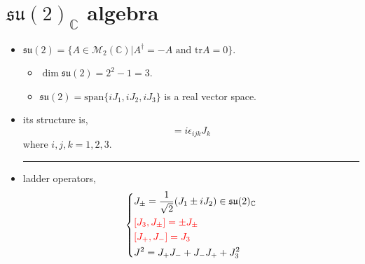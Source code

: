 \chapter{\texorpdfstring{$\mathfrak{su}(2)_\mathbb{C}$}{su(2)\_C} algebra}
\begin{itemize}
	\item $\mathfrak{su}(2) = \{A \in \mathcal{M}_2(\mathbb{C}) | A^\dag = - A \text{ and } \mathrm{tr} A = 0\}$.
	\begin{itemize}
		\item $\dim \mathfrak{su}(2) = 2^2 - 1 = 3$.
		
		\item $\mathfrak{su}(2) = \mathrm{span} \{i J_1, i J_2, i J_3\}$ is a real vector space.
	\end{itemize}
	
	\item its structure is,
	\begin{equation}
		[J_i, J_j] = i \epsilon_{i j k} J_k
	\end{equation}
	where $i, j, k = 1, 2, 3$.
	
	\noindent\rule[0.5ex]{\linewidth}{0.5pt} %
	
	\item ladder operators,
	\begin{equation}
		\begin{dcases}
			J_\pm = \frac{1}{\sqrt{2}} (J_1 \pm i J_2) \in \mathfrak{su}(2)_{\mathbb{C}} \\
			\mathcolor{red}{[J_3, J_\pm] = \pm J_\pm} \\
			\mathcolor{red}{[J_+, J_-] = J_3} \\
			J^2 = J_+ J_- + J_- J_+ + J_3^2
		\end{dcases}
	\end{equation}
	

\end{itemize}
